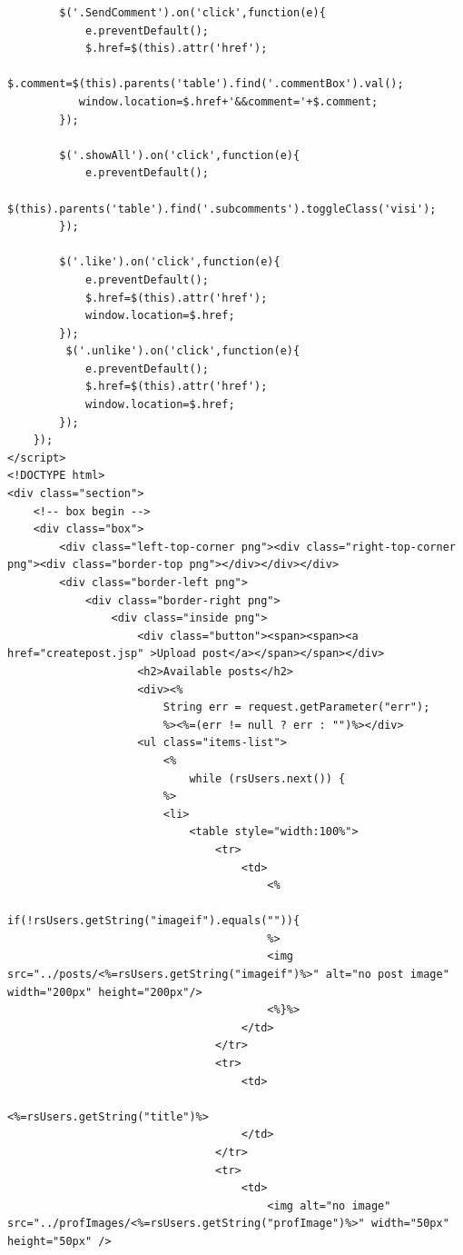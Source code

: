 \documentclass[a4paper,12pt]{article}
\begin{document}
\begin{verbatim}
        $('.SendComment').on('click',function(e){
            e.preventDefault();
            $.href=$(this).attr('href');
            $.comment=$(this).parents('table').find('.commentBox').val();
           window.location=$.href+'&&comment='+$.comment;
        });
        
        $('.showAll').on('click',function(e){
            e.preventDefault();
            $(this).parents('table').find('.subcomments').toggleClass('visi');
        });
        
        $('.like').on('click',function(e){
            e.preventDefault();
            $.href=$(this).attr('href');
            window.location=$.href;
        });
         $('.unlike').on('click',function(e){
            e.preventDefault();
            $.href=$(this).attr('href');
            window.location=$.href;
        });
    });
</script>
<!DOCTYPE html>
<div class="section">
    <!-- box begin -->
    <div class="box">
        <div class="left-top-corner png"><div class="right-top-corner png"><div class="border-top png"></div></div></div>
        <div class="border-left png">
            <div class="border-right png">
                <div class="inside png">
                    <div class="button"><span><span><a href="createpost.jsp" >Upload post</a></span></span></div>
                    <h2>Available posts</h2>
                    <div><%
                        String err = request.getParameter("err");
                        %><%=(err != null ? err : "")%></div>
                    <ul class="items-list">
                        <%
                            while (rsUsers.next()) {
                        %>
                        <li>
                            <table style="width:100%">
                                <tr>
                                    <td>
                                        <%
                                        if(!rsUsers.getString("imageif").equals("")){
                                        %>
                                        <img src="../posts/<%=rsUsers.getString("imageif")%>" alt="no post image" width="200px" height="200px"/>
                                        <%}%>
                                    </td>
                                </tr>
                                <tr>
                                    <td>
                                        <%=rsUsers.getString("title")%>
                                    </td>
                                </tr>
                                <tr>
                                    <td>
                                        <img alt="no image" src="../profImages/<%=rsUsers.getString("profImage")%>" width="50px" height="50px" />

\end{verbatim}
\end{document}
